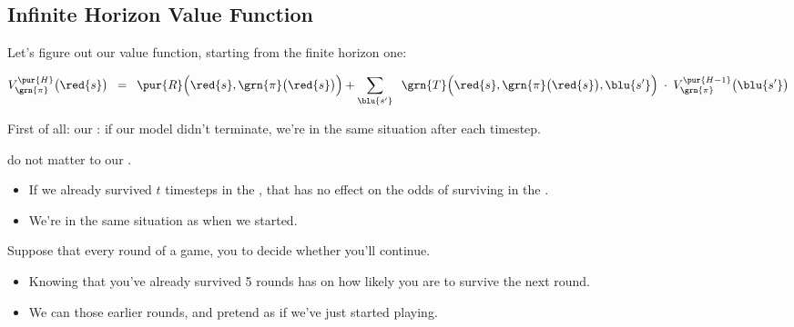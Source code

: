     \pagebreak

    \subsection{Infinite Horizon Value Function}

        Let's figure out our value function, starting from the finite horizon one:

        \begin{equation}
            V_{\grn{\pi}}^{\pur{H}}\big(\red{s} \big) \;\;=\;\; 
                \pur{R} \Big( \red{s},\grn{\pi}\big(\red{s}\big) \Big) +
            \sum_{\blu{s'}}  
                    \;\;
                    \grn{T} \Big(          \red{s},\grn{\pi}\big(\red{s}\big),\blu{s'} \Big)
                    \;\cdot\; 
                    V_{\grn{\pi}}^{\pur{H-1}}\big(\blu{s'} \big)
        \end{equation}

        First of all: our : if our model didn't terminate, we're in the same situation after each timestep.\\

        \begin{concept}
             do not matter to our .

            \begin{itemize}
                \item If we already survived $t$ timesteps in the , that has no effect on the odds of surviving in the .
                \item We're in the same situation as when we started.
            \end{itemize}

            
        \end{concept}

        \miniex Suppose that every round of a game, you  to decide whether you'll continue.

        \begin{itemize}
            \item Knowing that you've already survived 5 rounds has  on how likely you are to survive the next round.
            \item We can  those earlier rounds, and pretend as if we've just started playing.
        \end{itemize}

